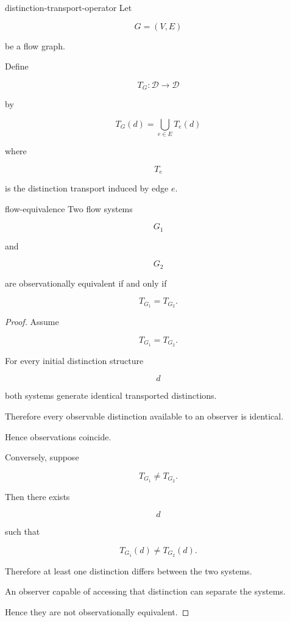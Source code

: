 \documentclass[12pt,twoside,openright]{book}
\begin{document}
\begin{definition}{distinction-transport-operator}
Let

\[
G=(V,E)
\]

be a flow graph.

Define

\[
T_G :
\mathcal D
\rightarrow
\mathcal D
\]

by

\[
T_G(d)
=
\bigcup_{e\in E}
T_e(d)
\]

where

\[
T_e
\]

is the distinction transport induced by edge \(e\).
\end{definition}

\begin{theorem}{flow-equivalence}
Two flow systems

\[
G_1
\]

and

\[
G_2
\]

are observationally equivalent if and only if

\[
T_{G_1}
=
T_{G_2}.
\]
\end{theorem}

\begin{proof}
Assume

\[
T_{G_1}
=
T_{G_2}.
\]

For every initial distinction structure

\[
d
\]

both systems generate identical transported
distinctions.

Therefore every observable distinction available to an
observer is identical.

Hence observations coincide.

Conversely, suppose

\[
T_{G_1}
\neq
T_{G_2}.
\]

Then there exists

\[
d
\]

such that

\[
T_{G_1}(d)
\neq
T_{G_2}(d).
\]

Therefore at least one distinction differs between the
two systems.

An observer capable of accessing that distinction can
separate the systems.

Hence they are not observationally equivalent.
\end{proof}
\end{document}

